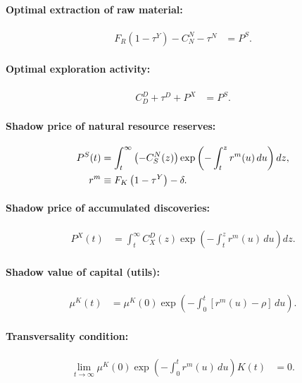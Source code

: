 \paragraph{Optimal extraction of raw material:}
\begin{align}
F_R\left(1-\tau^Y\right) - C_N^N - \tau^N &= P^S.
\label{eq:market:optimal-extraction}
\end{align}

\paragraph{Optimal exploration activity:}
\begin{align}
C_D^D + \tau^D + P^X &= P^S.
\label{eq:market:optimal-exploration}
\end{align}

\paragraph{Shadow price of natural resource reserves:}
\begin{align}
P^S(t) &= \int_t^{\infty} \left(-C_S^N(z)\right)
\exp\left(-\int_t^{z} r^m(u)\,du\right) dz,
\label{eq:market:reserve-shadow}
\\
r^m &\equiv F_K\left(1-\tau^Y\right) - \delta.
\notag
\end{align}

\paragraph{Shadow price of accumulated discoveries:}
\begin{align}
P^X(t) &= \int_t^{\infty} C_X^D(z)
\exp\left(-\int_t^{z} r^m(u)\,du\right) dz.
\label{eq:market:discovery-shadow}
\end{align}

\paragraph{Shadow value of capital (utils):}
\begin{align}
\mu^K(t) &= \mu^K(0)
\exp\left(-\int_0^t \left[r^m(u)-\rho\right]\,du\right).
\label{eq:market:capital-shadow}
\end{align}

\paragraph{Transversality condition:}
\begin{align}
\lim_{t\to\infty} \mu^K(0)\exp\left(-\int_0^t r^m(u)\,du\right)K(t) &= 0.
\label{eq:market:transversality}
\end{align}


